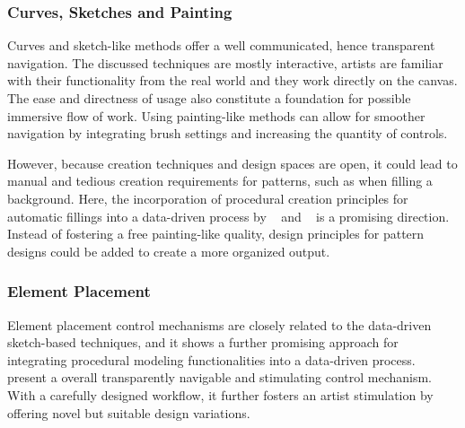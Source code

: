 \subsubsection{Curves, Sketches and Painting}
\label{subsubsec:analysis_creative_means_curves}

Curves and sketch-like methods offer a well communicated, hence transparent navigation. 
The discussed techniques are mostly interactive, artists are familiar with their functionality from the real world and they work directly on the canvas. The ease and directness of usage also constitute a foundation for possible immersive flow of work. Using painting-like methods can allow for smoother navigation by integrating brush settings and increasing the quantity of controls.

However, because creation techniques and design spaces are open, it could lead to manual and tedious creation requirements for patterns, such as when filling a background. Here, the incorporation of procedural creation principles for automatic fillings into a data-driven process by \citeauthor*{kazi_2012_vit}~\cite{kazi_2012_vit} and \citeauthor*{xing_2014_apr}~\cite{xing_2014_apr} is a promising direction. Instead of fostering a free painting-like quality, design principles for pattern designs could be added to create a more organized output.

\subsubsection{Element Placement}
\label{subsubsec:analysis_creative_means_elements}

Element placement control mechanisms are closely related to the data-driven sketch-based techniques, and it shows a further promising approach for integrating procedural modeling functionalities into a data-driven process. 
\citeauthor*{guerrero_2016_pep}~\cite{guerrero_2016_pep} present a overall transparently navigable and stimulating control mechanism. With a carefully designed workflow, it further fosters an artist stimulation by offering novel but suitable design variations.

